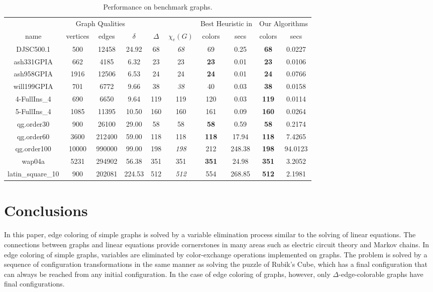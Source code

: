 \documentclass[11pt]{article}
\begin{document}
	\begin{table}[thbp]
		\centering
		\footnotesize
		\begin{tabular}{|c||c|c|c|c|c||c|c|c|c|}
			\hline
			\multicolumn{6}{|c||}{Graph Qualities} & \multicolumn{2}{c|}{Best Heuristic in \cite{hilgemeier2003fast}} & \multicolumn{2}{c|}{Our Algorithms} \\
			name & vertices & edges & $\delta$ & $\Delta$ & $\chi_e(G)$ & colors & secs & colors & secs \\
			\hline\hline
			DJSC500.1 & 500 & 12458 & 24.92 & 68 & \emph{68} & 69 & 0.25 & \textbf{68} & 0.0227 \\
			ash331GPIA & 662 & 4185 & 6.32 & 23 & 23  & \textbf{23} & 0.01 & \textbf{23} & 0.0106 \\
			ash958GPIA & 1916 & 12506 & 6.53 & 24 & 24 & \textbf{24} & 0.01 & \textbf{24} & 0.0766 \\
			will199GPIA & 701 & 6772 & 9.66 & 38 & \emph{38} & 40 & 0.03 & \textbf{38} & 0.0158 \\
			4-FullIns\_4 & 690 & 6650 & 9.64 & 119 & 119 & 120 & 0.03 & \textbf{119} & 0.0114 \\
			5-FullIns\_4 & 1085 & 11395 & 10.50 & 160 & 160 & 161 & 0.09 & \textbf{160} & 0.0264 \\
			qg.order30 & 900 & 26100 & 29.00 & 58 & 58 & \textbf{58} & 0.59 & \textbf{58} & 0.2174 \\
			qg.order60 & 3600 & 212400 & 59.00 & 118 & 118 & \textbf{118} & 17.94 & \textbf{118} & 7.4265 \\
			qg.order100 & 10000 & 990000 & 99.00 & 198 & \emph{198} & 212 & 248.38 & \textbf{198} & 94.0123 \\
			wap04a & 5231 & 294902 & 56.38 & 351 & 351 & \textbf{351} & 24.98 & \textbf{351} & 3.2052 \\
			latin\_square\_10 & 900 & 202081 & 224.53 & 512 & \emph{512} & 554 & 268.85 & \textbf{512} & 2.1981 \\
			\hline
		\end{tabular}
		\caption{Performance on benchmark graphs.}
		\label{tab:benchmark_graphs}
	\end{table}

\section{Conclusions}

In this paper, edge coloring of simple graphs is solved by a variable elimination process similar to the solving of linear equations. The connections between graphs and linear equations provide cornerstones in many areas such as electric circuit theory and Markov chains. In edge coloring of simple graphs, variables are eliminated by color-exchange operations implemented on graphs. The problem is solved by a sequence of configuration transformations in the same manner as solving the puzzle of Rubik's Cube, which has a final configuration that can always be reached from any initial configuration. In the case of edge coloring of graphs, however, only $\Delta$-edge-colorable graphs have final configurations.
\end{document}
